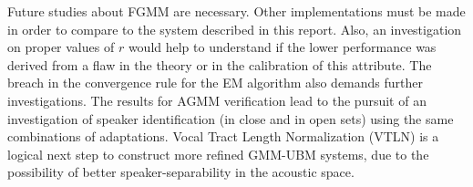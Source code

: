 Future studies about FGMM are necessary. Other implementations must be made in order to compare to the system described in this report. Also, an investigation on proper values of $r$ would help to understand if the lower performance was derived from a flaw in the theory or in the calibration of this attribute. The breach in the convergence rule for the EM algorithm also demands further investigations. The results for AGMM verification lead to the pursuit of an investigation of speaker identification (in close and in open sets) using the same combinations of adaptations. Vocal Tract Length Normalization (VTLN) is a logical next step to construct more refined GMM-UBM systems, due to the possibility of better speaker-separability in the acoustic space.